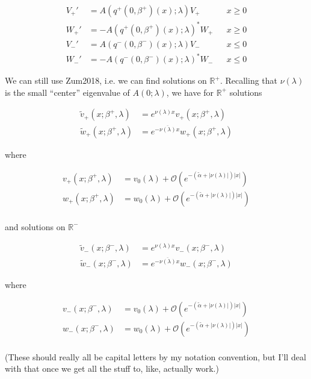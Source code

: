\documentclass[12pt]{article}
\def\R{{\mathbb R}}
\begin{document}
\begin{align}
V_+' &= A(q^+(0, \beta^+)(x); \lambda) V_+ && x \geq 0 \label{eig:V+} \\
W_+' &= -A(q^+(0, \beta^+)(x); \lambda)^* W_+ && x \geq 0\label{eig:W+} \\
V_-' &= A(q^-(0, \beta^-)(x); \lambda) V_- && x \leq 0 \label{eig:V-} \\
W_-' &= -A(q^-(0, \beta^-)(x); \lambda)^* W_- && x \leq 0 \label{eig:W-}
\end{align}

We can still use Zum2018, i.e. we can find solutions on $\R^+$. Recalling that $\nu(\lambda)$ is the small ``center'' eigenvalue of $A(0; \lambda)$, we have for $\R^+$ solutions

\begin{align}
\tilde{v}_+(x; \beta^+, \lambda) &= e^{\nu(\lambda) x } v_+(x; \beta^+, \lambda) \label{tildev+} \\
\tilde{w}_+(x; \beta^+, \lambda) &= e^{-\overline{\nu(\lambda)} x } w_+(x; \beta^+, \lambda) \label{tildew+} 
\end{align}

where

\begin{align*}
v_+(x; \beta^+, \lambda) &= v_0(\lambda) + \mathcal{O}(e^{-(\tilde{\alpha} + |\nu(\lambda)|)|x|}) \\
w_+(x; \beta^+, \lambda) &= w_0(\lambda) + \mathcal{O}(e^{-(\tilde{\alpha} + |\nu(\lambda)|)|x|})\\
\end{align*}

and solutions on $\R^-$

\begin{align}
\tilde{v}_-(x; \beta^-, \lambda) &= e^{\nu(\lambda) x } v_-(x; \beta^-, \lambda) \label{tildev-} \\
\tilde{w}_-(x; \beta^-, \lambda) &= e^{-\overline{\nu(\lambda)} x } w_-(x; \beta^-, \lambda) \label{tildew-} 
\end{align}

where

\begin{align*}
v_-(x; \beta^-, \lambda) &= v_0(\lambda) + \mathcal{O}(e^{-(\tilde{\alpha} + |\nu(\lambda)|)|x|}) \\
w_-(x; \beta^-, \lambda) &= w_0(\lambda) + \mathcal{O}(e^{-(\tilde{\alpha} + |\nu(\lambda)|)|x|})\\
\end{align*}

(These should really all be capital letters by my notation convention, but I'll deal with that once we get all the stuff to, like, actually work.)\\
\end{document}
